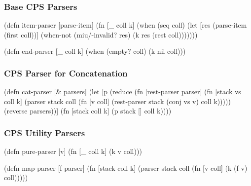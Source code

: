 \documentclass{beamer}
\begin{document}

\begin{frame}[fragile]
\frametitle{Base CPS Parsers}

\begin{semiverbatim}
(defn item-parser [parse-item]
  (fn [_ coll k]
    (when (seq coll)
      (let [res (parse-item (first coll))]
        (when-not (miu/-invalid? res)
          (k res (rest coll)))))))
\end{semiverbatim}

\begin{semiverbatim}
(defn end-parser [_ coll k]
  (when (empty? coll)
    (k nil coll)))
\end{semiverbatim}

\end{frame}


\begin{frame}[fragile]
\frametitle{CPS Parser for Concatenation}

{\scriptsize
\begin{semiverbatim}
(defn cat-parser [& parsers]
  (let [p (reduce (fn [rest-parser parser]
                    (fn [stack vs coll k]
                      (parser stack coll
                              (fn [v coll]
                                (rest-parser stack (conj vs v) coll k)))))
                  (reverse parsers))]
    (fn [stack coll k] (p stack [] coll k))))
\end{semiverbatim}
}

\end{frame}


\begin{frame}[fragile]
\frametitle{CPS Utility Parsers}

\begin{semiverbatim}
(defn pure-parser [v] (fn [_ coll k] (k v coll)))
\end{semiverbatim}

\begin{semiverbatim}
(defn map-parser [f parser]
  (fn [stack coll k]
    (parser stack coll
            (fn [v coll] (k (f v) coll)))))
\end{semiverbatim}

\end{frame}

\end{document}
